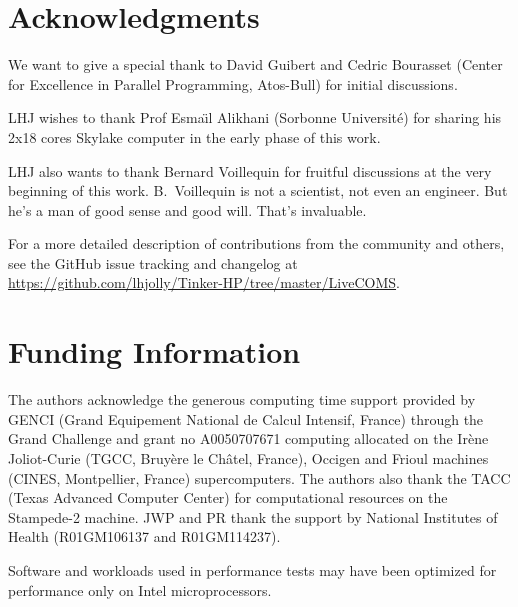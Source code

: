 \documentclass[9pt,comparison]{livecoms}
\newcommand{\githubrepository}{\url{https://github.com/lhjolly/Tinker-HP/tree/master/LiveCOMS}}  %
\begin{document}
\section{Acknowledgments}
%

\hspace{\parindent}We want to give a special thank to David Guibert and Cedric Bourasset (Center for Excellence in Parallel Programming, Atos-Bull) for initial discussions.

LHJ wishes to thank Prof Esma\"\i l Alikhani (Sorbonne Université) for sharing his 2x18 cores Skylake computer in the early phase of this work. 

LHJ also wants to thank Bernard Voillequin for fruitful discussions at the very beginning of this work. B.~Voillequin is not a scientist, not even an engineer. But he's a man of good sense and good will. That's invaluable.

For a more detailed description  of contributions from the community and others, see the GitHub issue tracking and changelog at \githubrepository.

\section{Funding Information}
\hspace{\parindent}The authors acknowledge the generous computing time support provided by GENCI (Grand Equipement National de Calcul Intensif, France) through the Grand Challenge and grant no A0050707671 computing allocated on the Irène Joliot-Curie (TGCC, Bruyère le Châtel, France), Occigen and Frioul machines (CINES, Montpellier, France) supercomputers. The authors also thank the TACC (Texas Advanced Computer Center) for computational resources on the Stampede-2 machine. JWP and PR thank the support by National Institutes of Health (R01GM106137 and R01GM114237).

Software and workloads used in performance tests may have been optimized for performance only on Intel microprocessors.
\end{document}
